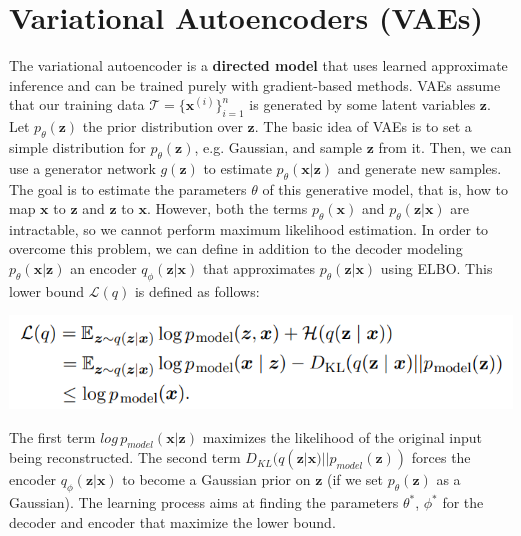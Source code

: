 \section{Variational Autoencoders (VAEs)}
The variational autoencoder is a \textbf{directed model} that uses learned approximate inference and can be trained purely with gradient-based methods.\newline\newline
VAEs assume that our training data $\mathcal{T} = \{\textbf{x}^{(i)}\}^n_{i=1}$ is generated by some latent variables $\textbf{z}$. Let $p_{\theta}(\textbf{z})$ the prior distribution over $\textbf{z}$. The basic idea of VAEs is to set a simple distribution for $p_{\theta}(\textbf{z})$, e.g. Gaussian, and sample $\textbf{z}$ from it. Then, we can use a generator network $g(\textbf{z})$ to estimate $p_{\theta}(\textbf{x}|\textbf{z})$ and generate new samples. The goal is to estimate the parameters $\theta$ of this generative model, that is, how to map $\textbf{x}$ to $\textbf{z}$ and $\textbf{z}$ to $\textbf{x}$. However, both the terms $p_{\theta}(\textbf{x})$ and $p_{\theta}(\textbf{z}|\textbf{x})$ are intractable, so we cannot perform maximum likelihood estimation.\newline\newline
In order to overcome this problem, we can define in addition to the decoder modeling $p_\theta(\textbf{x}|\textbf{z})$ an encoder $q_\phi(\textbf{z}|\textbf{x})$ that approximates $p_\theta(\textbf{z}|\textbf{x})$ using ELBO.
\newline\newline
This lower bound $\mathcal{L}(q)$ is defined as follows:
\begin{center}
    \includegraphics[scale=0.8]{images/VAE.png}
\end{center}
The first term $log\,p_{model}(\textbf{x}|\textbf{z})$ maximizes the likelihood of the original input being reconstructed. The second term $D_{KL}(q(\textbf{z}|\textbf{x}) || p_{model}(\textbf{z}))$ forces the encoder $q_\phi(\textbf{z}|\textbf{x})$ to become a Gaussian prior on $\textbf{z}$ (if we set $p_{\theta}(\textbf{z})$ as a Gaussian). The learning process aims at finding the parameters $\theta^*$, $\phi^*$ for the decoder and encoder that maximize the lower bound.\newline\newline
